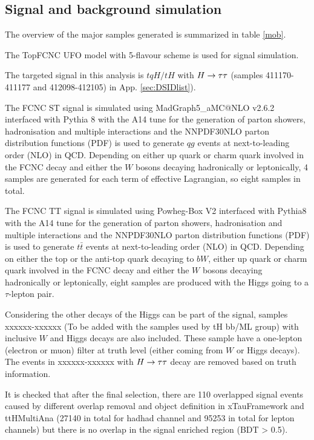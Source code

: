 \subsection{Signal and background simulation}
\label{sec:generator}

The overview of the major samples generated is summarized in table \ref{mob}.

The TopFCNC UFO model \cite{FCNC_UFO1,FCNC_UFO2} with 5-flavour scheme is used for signal simulation.

The targeted signal in this analysis is $tqH/tH$ with $H \rightarrow \tau\tau$ (samples 411170-411177 and 412098-412105) in App. \ref{sec:DSIDlist}).

The FCNC ST signal is simulated using MadGraph5\_aMC@NLO v2.6.2 \cite{MG5} interfaced with Pythia 8 \cite{Pythia8} with the A14 tune \cite{A14} for the generation of parton showers, hadronisation and multiple interactions and the NNPDF30NLO \cite{NNPDF30NLO} parton distribution functions (PDF) is used to generate $qg$ events at next-to-leading order (NLO) in QCD. Depending on either up quark or charm quark involved in the FCNC decay and either the $W$ bosons decaying hadronically or leptonically, 4 samples are generated for each term of effective Lagrangian, so eight samples in total.

The FCNC TT signal is simulated using Powheg-Box \cite{Powheg} V2 interfaced with Pythia8 \cite{Pythia8} with the A14 tune \cite{A14} for the generation of parton showers, hadronisation and multiple interactions and the NNPDF30NLO \cite{NNPDF30NLO} parton distribution functions (PDF) is used to generate $t\bar{t}$ events at next-to-leading order (NLO) in QCD. Depending on either the top or the anti-top quark decaying to $bW$, either up quark or charm quark involved in the FCNC decay and either the $W$ bosons decaying hadronically or leptonically, eight samples are produced with the Higgs going to a $\tau$-lepton pair.

Considering the other decays of the Higgs can be part of the signal, samples xxxxxx-xxxxxx (To be added with the samples used by tH bb/ML group) with inclusive $W$ and Higgs decays are also included. These sample have a one-lepton (electron or muon) filter at truth level (either coming from $W$ or Higgs decays). The events in xxxxxx-xxxxxx with $H \rightarrow \tau\tau$ decay are removed based on truth information.

It is checked that after the final selection, there are 110 overlapped signal events caused by different overlap removal and object definition in xTauFramework and ttHMultiAna (27140 in total for hadhad channel and 95253 in total for lepton channels) but there is no overlap in the signal enriched region (BDT > 0.5).

